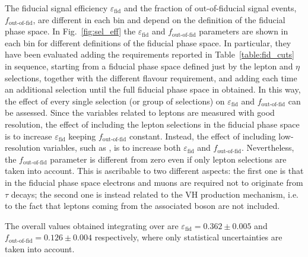 The fiducial signal efficiency $\varepsilon_\mathrm{fid}$ and the fraction of out-of-fiducial signal events, $f_{\text{out-of-fid}}$, are different in each \pth bin and depend on the definition of the fiducial phase space. In Fig.~\ref{fig:sel_eff} the $\varepsilon_\mathrm{fid}$ and $f_{\text{out-of-fid}}$ parameters are shown in each \pth bin for different definitions of the fiducial phase space. In particular, they have been evaluated adding the requirements reported in Table~\ref{table:fid_cuts} in sequence, starting from a fiducial phase space defined just by the lepton \pt and $\eta$ selections, together with the different flavour requirement, and adding each time an additional selection until the full fiducial phase space in obtained. In this way, the effect of every single selection (or group of selections) on $\varepsilon_\mathrm{fid}$ and $f_{\text{out-of-fid}}$ can be assessed. Since the variables related to leptons are measured with good resolution, the effect of including the lepton selections in the fiducial phase space is to increase $\varepsilon_\mathrm{fid}$ keeping $f_{\text{out-of-fid}}$ constant. Instead, the effect of including low-resolution variables, such as \mt, is to increase both $\varepsilon_\mathrm{fid}$ and $f_{\text{out-of-fid}}$. Nevertheless, the $f_{\text{out-of-fid}}$ parameter is different from zero even if only lepton selections are taken into account. This is ascribable to two different aspects: the first one is that in the fiducial phase space electrons and muons are required not to originate from $\tau$ decays; the second one is instead related to the VH production mechanism, i.e. to the fact that leptons coming from the associated boson are not included.

The overall values obtained integrating over \pth are $\varepsilon_\mathrm{fid}=0.362\pm{0.005}$ and $f_{\text{out-of-fid}}=0.126\pm0.004$ respectively, where only statistical uncertainties are taken into account.

